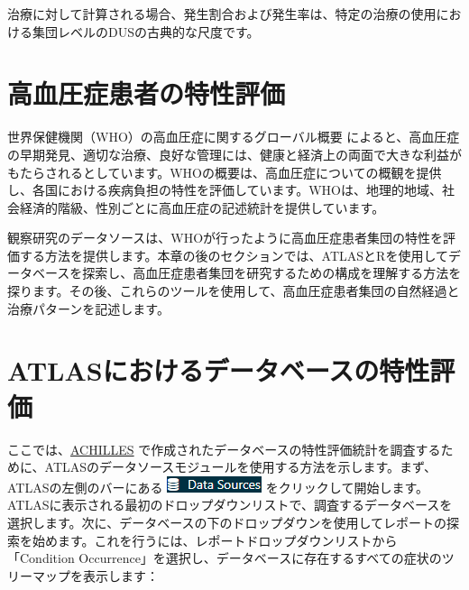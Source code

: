 \documentclass[
  11pt]{book}
\theoremstyle{definition}
\theoremstyle{definition}
\theoremstyle{definition}
\theoremstyle{definition}
\theoremstyle{remark}
\begin{document}
治療に対して計算される場合、発生割合および発生率は、特定の治療の使用における集団レベルのDUSの古典的な尺度です。

\section{高血圧症患者の特性評価}\label{ux9ad8ux8840ux5727ux75c7ux60a3ux8005ux306eux7279ux6027ux8a55ux4fa1}

世界保健機関（WHO）の高血圧症に関するグローバル概要 \citep{WHOHypertension} によると、高血圧症の早期発見、適切な治療、良好な管理には、健康と経済上の両面で大きな利益がもたらされるとしています。WHOの概要は、高血圧症についての概観を提供し、各国における疾病負担の特性を評価しています。WHOは、地理的地域、社会経済的階級、性別ごとに高血圧症の記述統計を提供しています。

観察研究のデータソースは、WHOが行ったように高血圧症患者集団の特性を評価する方法を提供します。本章の後のセクションでは、ATLASとRを使用してデータベースを探索し、高血圧症患者集団を研究するための構成を理解する方法を探ります。その後、これらのツールを使用して、高血圧症患者集団の自然経過と治療パターンを記述します。

\section{ATLASにおけるデータベースの特性評価}\label{atlasux306bux304aux3051ux308bux30c7ux30fcux30bfux30d9ux30fcux30b9ux306eux7279ux6027ux8a55ux4fa1}

ここでは、\href{https://github.com/OHDSI/Achilles}{ACHILLES} で作成されたデータベースの特性評価統計を調査するために、ATLASのデータソースモジュールを使用する方法を示します。まず、ATLASの左側のバーにある \includegraphics{images/Characterization/atlasDataSourcesMenuItem.png} をクリックして開始します。ATLASに表示される最初のドロップダウンリストで、調査するデータベースを選択します。次に、データベースの下のドロップダウンを使用してレポートの探索を始めます。これを行うには、レポートドロップダウンリストから「Condition Occurrence」を選択し、データベースに存在するすべての症状のツリーマップを表示します：
\end{document}
